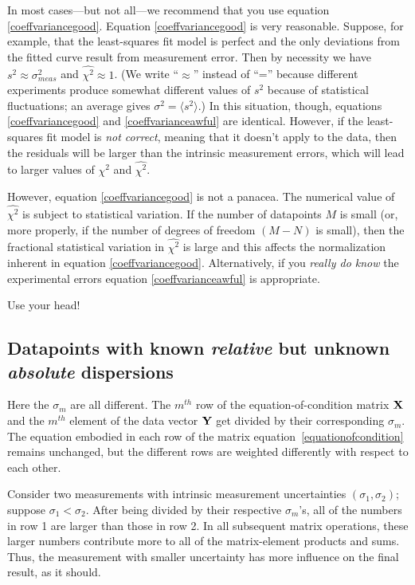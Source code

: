 \documentclass[psfig,preprint]{aastex}
\begin{document}
	In most cases---but not all---we recommend that you use equation
\ref{coeffvariancegood}.  Equation \ref{coeffvariancegood} is very
reasonable.  Suppose, for example, that the least-squares fit model is
perfect and the only deviations from the fitted curve result from
measurement error.  Then by necessity we have $s^2 \approx
\sigma_{meas}^2$ and $\widehat{\chi^2} \approx 1$.  (We write
``$\approx$'' instead of ``='' because different experiments produce
somewhat different values of $s^2$ because of statistical fluctuations;
an average gives $\sigma^2 = \langle s^2 \rangle$.) In this situation,
though, equations \ref{coeffvariancegood} and \ref{coeffvarianceawful}
are identical.  However, if the least-squares fit model is {\it not
correct}, meaning that it doesn't apply to the data, then the residuals
will be larger than the intrinsic measurement errors, which will lead to
larger values of $\chi^2$ and $\widehat{\chi^2}$. 

	However, equation \ref{coeffvariancegood} is not a panacea.  The
numerical value of $\widehat{\chi^2}$ is subject to statistical
variation.  If the number of datapoints $M$ is small (or, more properly,
if the number of degrees of freedom $(M-N)$ is small), then the
fractional statistical variation in $\widehat{\chi^2}$ is large and this
affects the normalization inherent in equation \ref{coeffvariancegood}.
Alternatively, if you {\it really do know} the experimental errors
equation \ref{coeffvarianceawful} is appropriate. 

	Use your head!

\subsection{Datapoints with known {\it relative} but unknown {\it
absolute} dispersions} \label{weightedcase}

	Here the $\sigma_{m}$ are all different. The $m^{th}$ row
of the equation-of-condition matrix ${\bf X}$ and the $m^{th}$
element of the data vector ${\bf Y}$ get divided by their
corresponding $\sigma_{m}$.  The equation embodied in each row of
the matrix equation~\ref{equationofcondition} remains unchanged, but the
different rows are weighted differently with respect to each other. 

	Consider two measurements with intrinsic measurement
uncertainties $(\sigma_{1}, \sigma_{2})$; suppose
$\sigma_{1} < \sigma_{2}$.  After being divided by their
respective $\sigma_{m}$'s, all of the numbers in row 1 are larger
than those in row 2.  In all subsequent matrix operations, these larger
numbers contribute more to all of the matrix-element products and sums. 
Thus, the measurement with smaller uncertainty has more influence on the
final result, as it should. 
\end{document}
